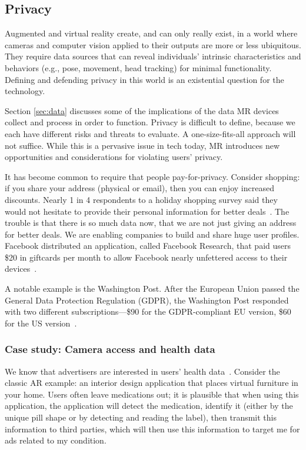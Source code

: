 
\subsection{Privacy}
Augmented and virtual reality create, and can only really exist, in a world where cameras and computer vision applied to their outputs are more or less ubiquitous. They require data sources that can reveal individuals' intrinsic characteristics and behaviors (e.g., pose, movement, head tracking) for minimal functionality. Defining and defending privacy in this world is an existential question for the technology.

Section \ref{sec:data} discusses some of the implications of the data MR devices collect and process in order to function. Privacy is difficult to define, because we each have different risks and threats to evaluate. A one-size-fits-all approach will not suffice. While this is a pervasive issue in tech today, MR introduces new opportunities and considerations for violating users' privacy.

It has become common to require that people pay-for-privacy. Consider shopping: if you share your address (physical or email), then you can enjoy increased discounts. Nearly 1 in 4 respondents to a holiday shopping survey said they would not hesitate to provide their personal information for better deals~\cite{moses}. The trouble is that there is so much data now, that we are not just giving an address for better deals. We are enabling companies to build and share huge user profiles. Facebook distributed an application, called Facebook Research, that paid users \$20 in giftcards per month to allow Facebook nearly unfettered access to their devices~\cite{axon}.

A notable example is the Washington Post. After the European Union passed the General Data Protection Regulation (GDPR), the Washington Post responded with two different subscriptions---\$90 for the GDPR-compliant EU version, \$60 for the US version~\cite{karl}.

\subsubsection{Case study: Camera access and health data}\label{sec:data:world:camera}

We know that advertisers are interested in users' health data~\cite{jeong2019insurers}. Consider the classic AR example: an interior design application that places virtual furniture in your home. Users often leave medications out; it is plausible that when using this application, the application will detect the medication, identify it (either by the unique pill shape or by detecting and reading the label), then transmit this information to third parties, which will then use this information to target me for ads related to my condition.

